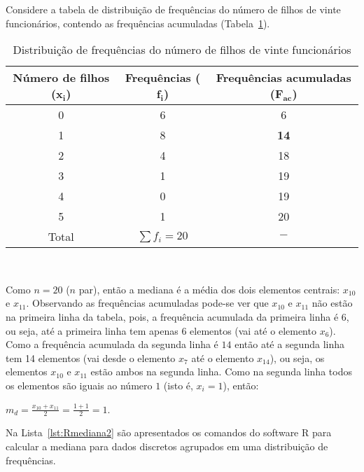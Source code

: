 \documentclass[11pt,fleqn]{book} %
\begin{document}
\begin{example}

Considere a tabela de distribuição de frequências do número de filhos de vinte funcionários, contendo as frequências acumuladas (Tabela~\ref{tab:distnumfilhosac}).


	\begin{table}[h]
	\caption{Distribuição de frequências do número de filhos de vinte funcionários}
	\label{tab:distnumfilhosac} 
	\vspace{-0.1cm}
	\centering
	\begin{tabular}{c c c}
	\toprule
	\textbf{Número de filhos} ($\bm{x_i}$) & \textbf{Frequências} ($\bm{f_i}$) & \textbf{Frequências acumuladas} ($\bm{F_{ac}}$) \\
	\midrule
	0 & 6 & 6 \\
	1 & 8 & \textcolor{ocre}{\bf 14} \\
	2 & 4 & 18 \\
	3 & 1 & 19 \\
	4 & 0 & 19 \\
	5 & 1 & 20 \\
	\hline
	Total & $\sum{f_i}=20$ & $-$\\
	\bottomrule
	\end{tabular} \\
	\end{table}
	
Como $n=20$ ($n$ par), então a mediana é a média dos dois elementos centrais: $x_{10}$ e $x_{11}$. Observando as frequências acumuladas pode-se ver que $x_{10}$ e $x_{11}$ não estão na primeira linha da tabela, pois, a frequência acumulada da primeira linha é $6$, ou seja, até a primeira linha tem apenas 6 elementos (vai até o elemento $x_6$). Como a frequência acumulada da segunda linha é $14$ então até a segunda linha tem 14 elementos (vai desde o elemento $x_7$ até o elemento $x_{14}$), ou seja, os elementos $x_{10}$  e $x_{11}$ estão ambos na segunda linha. Como na segunda linha todos os elementos são iguais ao número $1$ (isto é, $x_i=1$), então:

\begin{center}
$m_d=\displaystyle \frac{x_{10}+x_{11}}{2}=\frac{1+1}{2}=1$.
\end{center}

\end{example}

\vspace{0,3cm}

Na Lista~\ref{lst:Rmediana2} são apresentados os comandos do software R para calcular a mediana para dados discretos agrupados em uma distribuição de frequências. \\
\end{document}
